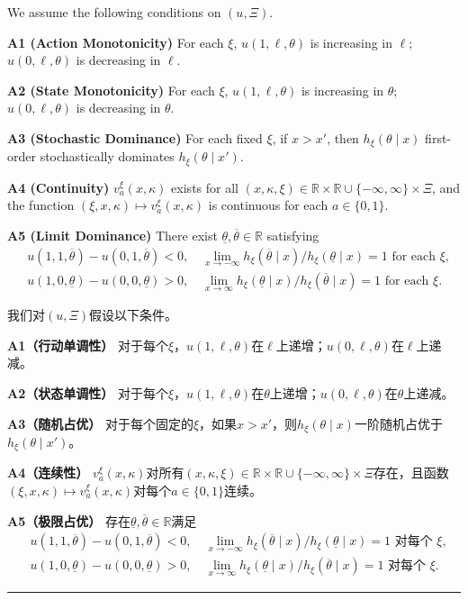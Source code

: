\documentclass[12pt,a4paper]{article}
\newenvironment{original}
  {\par\medskip\noindent\color{black}\ignorespaces}
  {\par\medskip}
\newenvironment{translation}
  {\par\noindent\color{darkblue}\ignorespaces}
  {\par\medskip\noindent\hrule\par\medskip}
\theoremstyle{definition}
\theoremstyle{remark}
\begin{document}
\begin{original}
We assume the following conditions on $(u, \Xi)$.

\textbf{A1 (Action Monotonicity)} For each $\xi$, $u(1, \ell, \theta)$ is increasing in $\ell$; $u(0, \ell, \theta)$ is decreasing in $\ell$.

\textbf{A2 (State Monotonicity)} For each $\xi$, $u(1, \ell, \theta)$ is increasing in $\theta$; $u(0, \ell, \theta)$ is decreasing in $\theta$.

\textbf{A3 (Stochastic Dominance)} For each fixed $\xi$, if $x > x'$, then $h_\xi(\theta \mid x)$ first-order stochastically dominates $h_\xi(\theta \mid x')$.

\textbf{A4 (Continuity)} $v_a^\xi(x, \kappa)$ exists for all $(x, \kappa, \xi) \in \mathbb{R} \times \mathbb{R} \cup \{-\infty, \infty\} \times \Xi$, and the function $(\xi, x, \kappa) \mapsto v_a^\xi(x, \kappa)$ is continuous for each $a \in \{0, 1\}$.

\textbf{A5 (Limit Dominance)} There exist $\underline{\theta}, \overline{\theta} \in \mathbb{R}$ satisfying
\begin{align*}
&u(1, 1, \overline{\theta}) - u(0, 1, \overline{\theta}) < 0, \quad \lim_{x \to -\infty} h_\xi(\overline{\theta} \mid x)/h_\xi(\underline{\theta} \mid x) = 1 \text{ for each } \xi,\\
&u(1, 0, \underline{\theta}) - u(0, 0, \underline{\theta}) > 0, \quad \lim_{x \to \infty} h_\xi(\underline{\theta} \mid x)/h_\xi(\overline{\theta} \mid x) = 1 \text{ for each } \xi.
\end{align*}
\end{original}
\begin{translation}
我们对$(u, \Xi)$假设以下条件。

\textbf{A1（行动单调性）} 对于每个$\xi$，$u(1, \ell, \theta)$在$\ell$上递增；$u(0, \ell, \theta)$在$\ell$上递减。

\textbf{A2（状态单调性）} 对于每个$\xi$，$u(1, \ell, \theta)$在$\theta$上递增；$u(0, \ell, \theta)$在$\theta$上递减。

\textbf{A3（随机占优）} 对于每个固定的$\xi$，如果$x > x'$，则$h_\xi(\theta \mid x)$一阶随机占优于$h_\xi(\theta \mid x')$。

\textbf{A4（连续性）} $v_a^\xi(x, \kappa)$对所有$(x, \kappa, \xi) \in \mathbb{R} \times \mathbb{R} \cup \{-\infty, \infty\} \times \Xi$存在，且函数$(\xi, x, \kappa) \mapsto v_a^\xi(x, \kappa)$对每个$a \in \{0, 1\}$连续。

\textbf{A5（极限占优）} 存在$\underline{\theta}, \overline{\theta} \in \mathbb{R}$满足
\begin{align*}
&u(1, 1, \overline{\theta}) - u(0, 1, \overline{\theta}) < 0, \quad \lim_{x \to -\infty} h_\xi(\overline{\theta} \mid x)/h_\xi(\underline{\theta} \mid x) = 1 \text{ 对每个 } \xi,\\
&u(1, 0, \underline{\theta}) - u(0, 0, \underline{\theta}) > 0, \quad \lim_{x \to \infty} h_\xi(\underline{\theta} \mid x)/h_\xi(\overline{\theta} \mid x) = 1 \text{ 对每个 } \xi.
\end{align*}
\end{translation}
\end{document}
